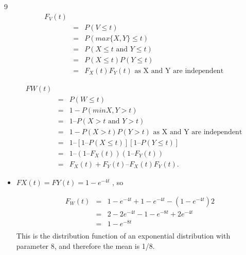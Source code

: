 \documentclass[a4paper,12pt]{article}
\begin{document}
9
\begin{eqnarray*}
F_V (t)\\ &=& P(V \leq t)\\ &=& P(max \{X, Y\} \leq t)
\\ &=& P(X \leq t \mbox{ and } Y \leq t)\\ &=& P(X \leq t) P(Y \leq t)\\ &=& F_X (t)F_Y (t)\mbox{ as X  and  Y are independent} 
\end{eqnarray*}

\begin{eqnarray*}
F W (t)\\ &=& P(W \leq t)\\ &=& 1 - P(min{X, Y} > t)
\\ &=& 1 – P(X > t \mbox{ and } Y > t)\\ &=& 1 - P(X > t) P(Y > t) \mbox{ as X  and  Y are independent} 
\\ &=& 1 – [1 – P(X \leq t)] [1 – P(Y \leq t)]
\\ &=& 1 – (1 – F_X (t)) (1 – F_Y (t))
\\ &=& F_X (t) + F_Y (t) – F_X (t)F_Y (t) .
\end{eqnarray*}

\begin{itemize}

\item
$FX(t) = FY(t) = 1 - e^{-4t}$ , so

\begin{eqnarray*}
F_W(t) &=& 1 - e^{-4t} + 1 - e^{-4t} - (1 - e^{-4t})2\\
&=& 2 - 2e^{-4t} - 1 - e^{-8t} + 2e^{-4t}\\
&=& 1 - e^{-8t}\\
\end{eqnarray*}
This is the distribution function of an exponential distribution with parameter 8, and
therefore the mean is 1/8.
\end{itemize}
\end{document}
